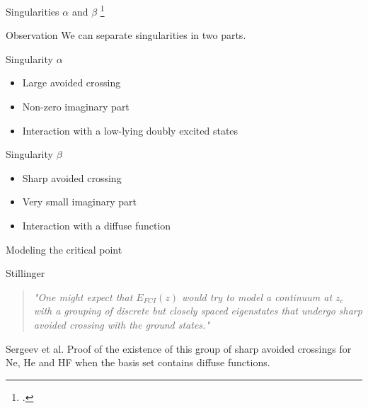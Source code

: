 \documentclass[xcolor=x11names,compress]{beamer}
\renewcommand{\(}{\begin{columns}}
\renewcommand{\)}{\end{columns}}
\newcommand{\<}[1]{\begin{column}{#1}}
\renewcommand{\>}{\end{column}}
\begin{document}
\begin{frame}{Singularities $\alpha$ and $\beta$ \footcite{sergeev_singularities_2006}}

\pause[1]

\begin{beamerboxesrounded}[scheme=foncé]{\centering Observation}
We can separate singularities in two parts. 
\end{beamerboxesrounded}   

\pause[2]

\begin{beamerboxesrounded}[scheme=foncé]{\centering Singularity $\alpha$}
\begin{itemize}
    \item Large avoided crossing
    \item Non-zero imaginary part
    \item Interaction with a low-lying doubly excited states
\end{itemize} 
\end{beamerboxesrounded}  

\pause[3]

\begin{beamerboxesrounded}[scheme=foncé]{\centering Singularity $\beta$}
\begin{itemize}
    \item Sharp avoided crossing
    \item Very small imaginary part
    \item Interaction with a diffuse function 
\end{itemize} 
\end{beamerboxesrounded} 

\end{frame}



\begin{frame}{Modeling the critical point}

\pause[1]

\begin{beamerboxesrounded}[scheme=foncé]{\centering Stillinger}
\begin{quote}
    \textit{"One might expect that $E_{FCI}(z) $ would try to model a continuum at $z_c$ with a grouping of discrete but closely spaced eigenstates that undergo sharp avoided crossing with the ground states."}
\end{quote}
\end{beamerboxesrounded}

\vspace{0.5cm}

\pause[2]

\begin{beamerboxesrounded}[scheme=foncé]{\centering Sergeev et al.}
Proof of the existence of this group of sharp avoided crossings for Ne, He and HF when the basis set contains diffuse functions.
\end{beamerboxesrounded}
    
\end{frame}
\end{document}

